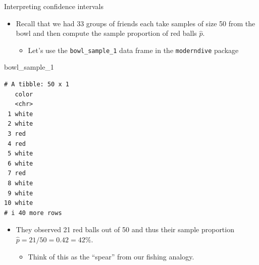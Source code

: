 \documentclass[
  ignorenonframetext,
]{beamer}
\newenvironment{Shaded}{\begin{snugshade}}{\end{snugshade}}
\newcommand{\NormalTok}[1]{#1}
\providecommand{\tightlist}{%
  \setlength{\itemsep}{0pt}\setlength{\parskip}{0pt}}
\begin{document}
\begin{frame}[fragile]{Interpreting confidence intervals}
\protect\hypertarget{interpreting-confidence-intervals-3}{}
\begin{itemize}
\item
  Recall that we had 33 groups of friends each take samples of size 50
  from the bowl and then compute the sample proportion of red balls
  \(\hat{p}\).

  \begin{itemize}
  \tightlist
  \item
    Let's use the \texttt{bowl\_sample\_1} data frame in the
    \texttt{moderndive} package
  \end{itemize}
\end{itemize}

\tiny

\begin{Shaded}
\begin{Highlighting}[]
\NormalTok{bowl\_sample\_1}
\end{Highlighting}
\end{Shaded}

\begin{verbatim}
# A tibble: 50 x 1
   color
   <chr>
 1 white
 2 white
 3 red  
 4 red  
 5 white
 6 white
 7 red  
 8 white
 9 white
10 white
# i 40 more rows
\end{verbatim}

\normalsize

\begin{itemize}
\item
  They observed 21 red balls out of 50 and thus their sample proportion
  \(\hat{p}=21/50 = 0.42 = 42\%\).

  \begin{itemize}
  \tightlist
  \item
    Think of this as the ``spear'' from our fishing analogy.
  \end{itemize}
\end{itemize}
\end{frame}
\end{document}
